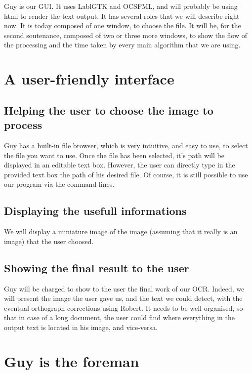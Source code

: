 \documentclass[12pt]{report}
\begin{document}
Guy is our GUI. It uses LablGTK and OCSFML, and will probably be using html to render the text output. It has several roles that we will describe right now. It is today composed of one window, to choose the file. It will be, for the second soutenance, composed of two or three more windows, to show the flow of the processing and the time taken by every main algorithm that we are using. 

\begin{center}
\end{center}

\section{A user-friendly interface}

\subsection{Helping the user to choose the image to process}

Guy has a built-in file browser, which is very intuitive, and easy to use, to select the file you want to use. Once the file has been selected, it's path will be displayed in an editable text box. However, the user can directly type in the provided text box the path of his desired file. Of course, it is still possible to use our program via the command-lines.

\subsection{Displaying the usefull informations}

We will display a miniature image of the image (assuming that it really is an image) that the user choosed.

\subsection{Showing the final result to the user}

Guy will be charged to show to the user the final work of our OCR. Indeed, we will present the image the user gave us, and the text we could detect, with the eventual orthograph corrections using Robert. It needs to be well organised, so that in case of a long document, the user could find where everything in the output text is located in his image, and vice-versa.

\section{Guy is the foreman}
\end{document}
